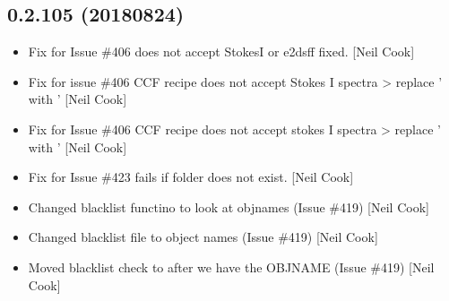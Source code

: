 \documentclass[a4paper,10pt,english]{report}
\begin{document}
\subsection{0.2.105 (2018\sphinxhyphen{}08\sphinxhyphen{}24)}
\label{\detokenize{misc/changelog:id372}}\begin{itemize}
\item {} 
Fix for Issue \#406 \sphinxhyphen{}  does not accept StokesI or e2dsff \sphinxhyphen{}
fixed. {[}Neil Cook{]}

\item {} 
Fix for issue \#406 \sphinxhyphen{} CCF recipe does not accept Stokes I spectra \textendash{}\textgreater{}
replace ’ with ’ {[}Neil Cook{]}

\item {} 
Fix for Issue \#406 \sphinxhyphen{}CCF recipe does not accept stokes I spectra \textendash{}\textgreater{}
replace ’ with ’ {[}Neil Cook{]}

\item {} 
Fix for Issue \#423 \sphinxhyphen{}  fails if folder does not exist. {[}Neil
Cook{]}

\item {} 
Changed blacklist functino to look at objnames (Issue \#419) {[}Neil
Cook{]}

\item {} 
Changed blacklist file to object names (Issue \#419) {[}Neil Cook{]}

\item {} 
Moved blacklist check to after we have the OBJNAME (Issue \#419) {[}Neil
Cook{]}

\end{itemize}
\end{document}
